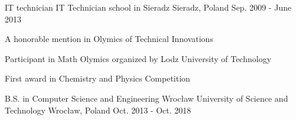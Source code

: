 

\begin{cventries}

  \cventry
    {IT technician}
    {IT Technician school in Sieradz}
    {Sieradz, Poland}
    {Sep. 2009 - June 2013}
    { 
      \begin{cvitems}
      \item {A honorable mention in Olymics of Technical Innovations}
      \item {Participant in Math Olymics organized by Lodz University of Technology}
      \item {First award in Chemistry and Physics Competition}  
      \end{cvitems}
    }
  \cventry
    {B.S. in Computer Science and Engineering} %
    {Wrocław University of Science and Technology} %
    {Wrocław, Poland} %
    {Oct. 2013 - Oct. 2018} %
    {}

\end{cventries}
